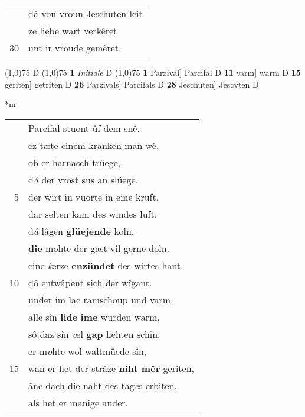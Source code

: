 \documentclass[8pt,a4paper,notitlepage]{article}
\begin{document}
\begin{table}[ht]
\begin{minipage}[t]{0.5\linewidth}
\begin{tabular}{rl}
 & dâ von vroun Jeschuten leit\\ 
 & ze liebe wart verkêret\\ 
30 & unt ir vröude gemêret.\\ 
\end{tabular}
\scriptsize
\line(1,0){75} \newline
D \newline
\line(1,0){75} \newline
\textbf{1} \textit{Initiale} D  \newline
\line(1,0){75} \newline
\textbf{1} Parzival] Parcifal D \textbf{11} varm] warm D \textbf{15} geriten] getriten D \textbf{26} Parzivals] Parcifals D \textbf{28} Jeschuten] Jescvten D \newline
\end{minipage}
\hspace{0.5cm}
\begin{minipage}[t]{0.5\linewidth}
\small
\begin{center}*m
\end{center}
\begin{tabular}{rl}
 & Parcifal stuont ûf dem snê.\\ 
 & ez tæte einem kranken man wê,\\ 
 & ob er harnasch trüege,\\ 
 & d\textit{â} der vrost sus an slüege.\\ 
5 & der wirt in vuorte in eine kruft,\\ 
 & dar selten kam des windes luft.\\ 
 & d\textit{â} lâgen \textbf{glüejende} koln.\\ 
 & \textbf{die} mohte der gast vil gerne doln.\\ 
 & eine \textit{k}erze \textbf{enzündet} des wirtes hant.\\ 
10 & dô entwâpent sich der wîgant.\\ 
 & under im lac ramschoup und varm.\\ 
 & alle sîn \textbf{lide} \textbf{ime} wurden warm,\\ 
 & sô daz sîn \textit{v}el \textbf{gap} liehten schîn.\\ 
 & er m\textit{o}hte wol waltmüede sîn,\\ 
15 & wan er het der strâze \textbf{niht mêr} geriten,\\ 
 & âne dach die naht des tag\textit{e}s erbiten.\\ 
 & als het er manige ander.\\ 

\end{tabular}
\end{minipage}
\end{table}
\end{document}
